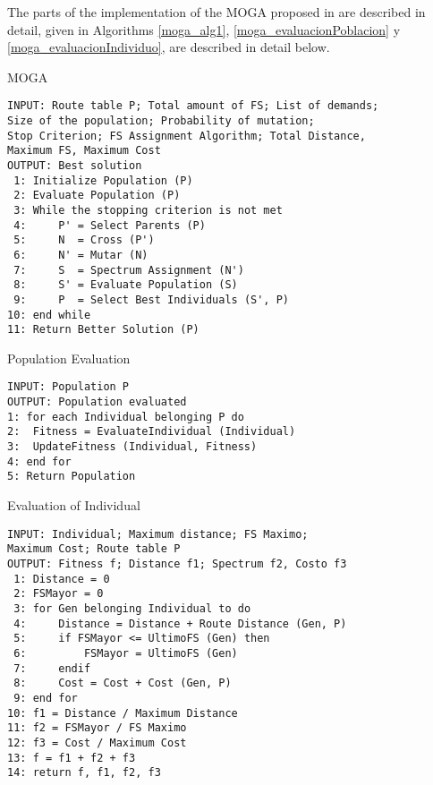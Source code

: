 The parts of the implementation of the MOGA proposed in \cite{engopt}
are described in detail, given in Algorithms \ref{moga_alg1}, \ref{moga_evaluacionPoblacion}
y \ref{moga_evaluacionIndividuo}, are described in detail below.

\begin{algorithm}[H]
\caption{MOGA}

\begin{lstlisting}
INPUT: Route table P; Total amount of FS; List of demands; 
Size of the population; Probability of mutation; 
Stop Criterion; FS Assignment Algorithm; Total Distance, 
Maximum FS, Maximum Cost 
OUTPUT: Best solution
 1: Initialize Population (P) 
 2: Evaluate Population (P) 
 3: While the stopping criterion is not met 
 4: 	P' = Select Parents (P) 
 5: 	N  = Cross (P') 
 6: 	N' = Mutar (N) 
 7: 	S  = Spectrum Assignment (N') 
 8: 	S' = Evaluate Population (S) 
 9: 	P  = Select Best Individuals (S', P) 
10: end while 
11: Return Better Solution (P)
\end{lstlisting}
\label{moga_alg1}
\end{algorithm}

\begin{algorithm}[H]
\caption{Population Evaluation}

\begin{lstlisting}
INPUT: Population P 
OUTPUT: Population evaluated 
1: for each Individual belonging P do 
2: 	Fitness = EvaluateIndividual (Individual) 
3: 	UpdateFitness (Individual, Fitness) 
4: end for 
5: Return Population
\end{lstlisting}
\label{moga_evaluacionPoblacion}
\end{algorithm}

\begin{algorithm}[H]
\caption{Evaluation of Individual}

\begin{lstlisting}
INPUT: Individual; Maximum distance; FS Maximo; 
Maximum Cost; Route table P 
OUTPUT: Fitness f; Distance f1; Spectrum f2, Costo f3 
 1: Distance = 0 
 2: FSMayor = 0 
 3: for Gen belonging Individual to do 
 4: 	Distance = Distance + Route Distance (Gen, P) 
 5: 	if FSMayor <= UltimoFS (Gen) then 
 6: 		FSMayor = UltimoFS (Gen) 
 7: 	endif
 8: 	Cost = Cost + Cost (Gen, P) 
 9: end for
10: f1 = Distance / Maximum Distance 
11: f2 = FSMayor / FS Maximo 
12: f3 = Cost / Maximum Cost 
13: f = f1 + f2 + f3 
14: return f, f1, f2, f3
\end{lstlisting}
\label{moga_evaluacionIndividuo}
\end{algorithm}


